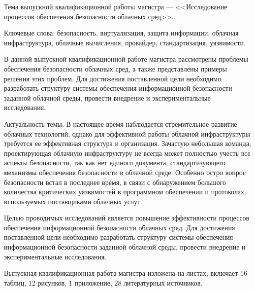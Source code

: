 
Тема выпускной квалификационной работы магистра --- <<Исследование процессов обеспечения безопасности облачных сред>>.

Ключевые слова: безопасность, виртуализация, защита информации, облачная инфраструктура, облачные вычисления, провайдер, стандартизация, уязвимости.

В данной выпускной квалификационной работе магистра рассмотрены проблемы обеспечения безопасности облачных сред, а также представлены примеры решения этих проблем.
Для достижения поставленной цели необходимо разработать структуру системы обеспечения информационной безопасности заданной облачной среды, провести внедрение и экспериментальные исследования.

Актуальность темы.
В настоящее время наблюдается стремительное развитие облачных технологий, однако для эффективной работы облачной инфраструктуры требуется ее эффективная структура и организация.
Зачастую небольшая команда, проектирующая облачную инфраструктуру не всегда может полностью учесть все аспекты безопасности, так как нет единого документа, стандартизующего механизмы обеспечения безопасности в облачной среде.
Особенно остро вопрос безопасности встал в последнее время, в связи с обнаружением большого количества критических уязвимостей в программном обеспечении и протоколах, используемых поставщиками облачных услуг.

Целью проводимых исследований является повышение эффективности процессов обеспечения информационной безопасности облачных сред.
Для достижения поставленной цели необходимо разработать структуру системы обеспечения информационной безопасности  заданной облачной среды, провести внедрение и экспериментальные исследования.

Выпускная квалификационная работа магистра изложена на \pageref{LastPage} листах, включает 16 таблиц, 12 рисунков, 1 приложение, 28 литературных источников.

\clearpage
